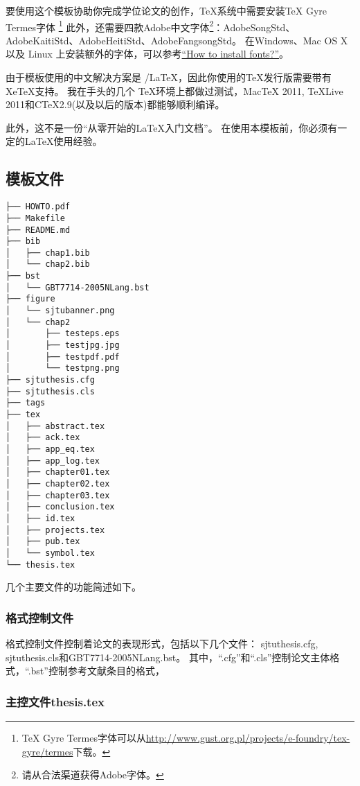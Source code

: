要使用这个模板协助你完成学位论文的创作，TeX系统中需要安装TeX Gyre Termes字体
\footnote{TeX Gyre Termes字体可以从\href{http://www.gust.org.pl/projects/e-foundry/tex-gyre/termes}{http://www.gust.org.pl/projects/e-foundry/tex-gyre/termes}下载。}
此外，还需要四款Adobe中文字体\footnote{请从合法渠道获得Adobe字体。}：AdobeSongStd、AdobeKaitiStd、AdobeHeitiStd、AdobeFangsongStd。
在Windows、Mac OS X 以及 Linux 上安装额外的字体，可以参考\href{https://www.searchfreefonts.com/articles/how-to-install-fonts.htm}{“How to install fonts?”}。

由于模板使用的中文解决方案是 \XeTeX/\LaTeX{}，因此你使用的TeX发行版需要带有XeTeX支持。 
我在手头的几个 \TeX 环境上都做过测试，MacTeX 2011, TeXLive 2011和C\TeX 2.9(以及以后的版本)都能够顺利编译。
 
此外，这不是一份“从零开始的\LaTeX{}入门文档”。
在使用本模板前，你必须有一定的\LaTeX{}使用经验。

\subsection{模板文件}
\label{sec:layout}

\begin{lstlisting}[basicstyle=\small\ttfamily,caption={模板文件布局},label=layout,float,numbers=none]
├── HOWTO.pdf
├── Makefile
├── README.md
├── bib
│   ├── chap1.bib
│   └── chap2.bib
├── bst
│   └── GBT7714-2005NLang.bst
├── figure
│   └── sjtubanner.png
│   └── chap2
│       ├── testeps.eps
│       ├── testjpg.jpg
│       ├── testpdf.pdf
│       └── testpng.png
├── sjtuthesis.cfg
├── sjtuthesis.cls
├── tags
├── tex
│   ├── abstract.tex
│   ├── ack.tex
│   ├── app_eq.tex
│   ├── app_log.tex
│   ├── chapter01.tex
│   ├── chapter02.tex
│   ├── chapter03.tex
│   ├── conclusion.tex
│   ├── id.tex
│   ├── projects.tex
│   ├── pub.tex
│   └── symbol.tex
└── thesis.tex
\end{lstlisting}

几个主要文件的功能简述如下。

\subsubsection{格式控制文件}
\label{sec:format}

格式控制文件控制着论文的表现形式，包括以下几个文件：
sjtuthesis.cfg, sjtuthesis.cls和GBT7714-2005NLang.bst。
其中，``.cfg''和``.cls''控制论文主体格式，``.bst''控制参考文献条目的格式，

\subsubsection{主控文件thesis.tex}
\label{sec:thesistex}

